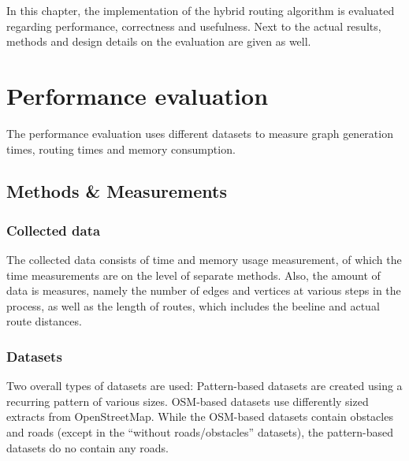 
In this chapter, the implementation of the hybrid routing algorithm is evaluated regarding performance, correctness and usefulness.
Next to the actual results, methods and design details on the evaluation are given as well.

\section{Performance evaluation}

	The performance evaluation uses different datasets to measure graph generation times, routing times and memory consumption.

	\subsection{Methods \& Measurements}

		\subsubsection{Collected data}
		
			The collected data consists of time and memory usage measurement, of which the time measurements are on the level of separate methods.
			Also, the amount of data is measures, namely the number of edges and vertices at various steps in the process, as well as the length of routes, which includes the beeline and actual route distances.
		
		\subsubsection{Datasets}
		\label{subsubsec:eval-datasets}
		
			Two overall types of datasets are used:
			Pattern-based datasets are created using a recurring pattern of various sizes.
			OSM-based datasets use differently sized extracts from OpenStreetMap.
			While the OSM-based datasets contain obstacles and roads (except in the \enquote{without roads/obstacles} datasets), the pattern-based datasets do no contain any roads.
			
